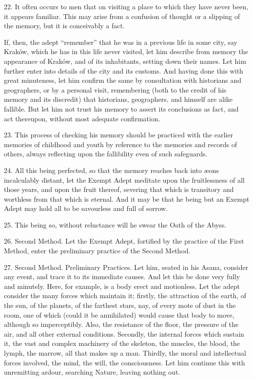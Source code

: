 22. It often occurs to men that on visiting a place to which they have never been, it appears familiar. This may arise from a confusion of thought or a slipping of the memory, but it is conceivably a fact.

If, then, the adept \enquote{remember} that he was in a previous life in some city, say Krak\'{o}w, which he has in this life never visited, let him describe from memory the appearance of Krak\'{o}w, and of its inhabitants, setting down their names. Let him further enter into details of the city and its customs. And having done this with great minuteness, let him confirm the same by consultation with historians and geographers, or by a personal visit, remembering (both to the credit of his memory and its discredit) that historians, geographers, and himself are alike fallible. But let him not trust his memory to assert its conclusions as fact, and act thereupon, without most adequate confirmation.

23. This process of checking his memory should be practiced with the earlier memories of childhood and youth by reference to the memories and records of others, always reflecting upon the fallibility even of such safeguards.

24. All this being perfected, so that the memory reaches back into \ae{}ons incalculably distant, let the Exempt Adept meditate upon the fruitlessness of all those years, and upon the fruit thereof, severing that which is transitory and worthless from that which is eternal. And it may be that he being but an Exempt Adept may hold all to be savourless and full of sorrow.

25. This being so, without reluctance will he swear the Oath of the Abyss.

26. Second Method. Let the Exempt Adept, fortified by the practice of the First Method, enter the preliminary practice of the Second Method.

27. Second Method. Preliminary Practices. Let him, seated in his Asana, consider any event, and trace it to its immediate causes. And let this be done very fully and minutely. Here, for example, is a body erect and motionless. Let the adept consider the many forces which maintain it; firstly, the attraction of the earth, of the sun, of the planets, of the farthest stars, nay, of every mote of dust in the room, one of which (could it be annihilated) would cause that body to move, although so imperceptibly. Also, the resistance of the floor, the pressure of the air, and all other external conditions. Secondly, the internal forces which sustain it, the vast and complex machinery of the skeleton, the muscles, the blood, the lymph, the marrow, all that makes up a man. Thirdly, the moral and intellectual forces involved, the mind, the will, the consciousness. Let him continue this with unremitting ardour, searching Nature, leaving nothing out.

